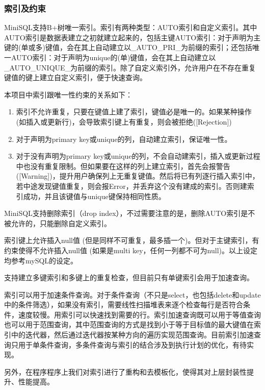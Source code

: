 \documentclass[12pt, a4paper]{article}
\def\sss#1{\subsubsection{#1}}
\def\p{\par}
\begin{document}
\sss{索引及约束}
\p MiniSQL支持B+树唯一索引。索引有两种类型：AUTO索引和自定义索引。其中AUTO索引是数据表建立之初就建立起来的，包括主键AUTO索引：对于声明为主键的(单或多)键值，会在其上自动建立以\_AUTO\_PRI\_为前缀的索引；还包括唯一AUTO索引：对于声明为unique的(单)键值，会在其上自动建立以\_AUTO\_UNIQUE\_为前缀的索引。除了自定义索引外，允许用户在不存在重复键值的键上建立自定义索引，便于快速查询。
\p 本项目中索引跟唯一性约束的关系如下：
\begin{enumerate}
  \item 索引不允许重复，只要在键值上建了索引，键值必是唯一的。如果某种操作(如插入或更新行)，会导致索引键上有重复，则会被拒绝([Rejection])
  \item 对于声明为primary key或unique的列，自动建立索引，保证唯一性。
  \item 对于没有声明为primary key或unique的列，不会自动建索引，插入或更新过程中也没有重复限制。但如果要在这样的列上建立索引，首先会报警告([Warning])，提升用户确保列上无重复键值。然后将已有列逐行插入索引中，若中途发现键值重复，则会报Error，并丢弃这个没有建成的索引。否则建索引成功，并且该键值与unique键保持相同性质。
\end{enumerate}
\p MiniSQL支持删除索引（drop index），不过需要注意的是，删除AUTO索引是不被允许的，只能删除自定义索引。
\p 索引键上允许插入null值 (但是同样不可重复，最多插一个)。但对于主键索引，有约束使得不允许插入null值 (如果是multi key，任何一列都不可为null)。以上设定均参考mySQL的设定。
\p 支持建立多键索引和多键上的重复检查，但目前只有单键索引会用于加速查询。
\p 索引可以用于加速条件查询。对于条件查询（不只是select，也包括delete和update中的条件筛选），如果没有索引，需要线性扫描堆表来逐个检查每行是否符合条件，速度较慢。用索引可以快速找到需要的行。索引加速查询既可以用于等值查询也可以用于范围查询，其中范围查询的方式是找到小于等于目标值的最大键值在索引中的迭代器，然后通过迭代器按某种方向的遍历实现范围查询。目前索引加速查询只用于单条件查询，多条件查询与索引的结合涉及到执行计划的优化，有待实现。
\p 另外，在程序程序上我们对索引进行了重构和去模板化，使得其对上层封装性提升、性能提高。
\end{document}
